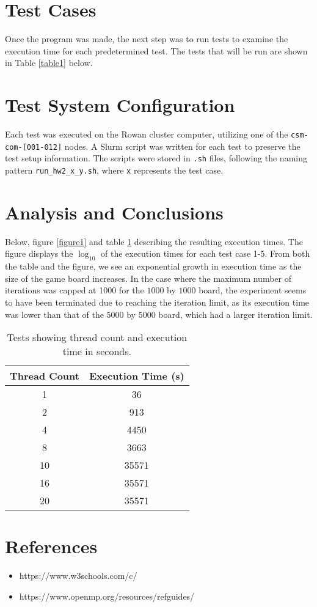 \documentclass{article}
\begin{document}
	\section{Test Cases}
	Once the program was made, the next step was to run tests to examine the execution time for each predetermined test. The tests that will be run are shown in Table \ref{table1} below.

	\section{Test System Configuration}
	Each test was executed on the Rowan cluster computer, utilizing one of the \texttt{csm-com-[001-012]} nodes. A Slurm script was written for each test to preserve the test setup information. The scripts were stored in \texttt{.sh} files, following the naming pattern \texttt{run\_hw2\_x\_y.sh}, where \texttt{x} represents the test case.

	\section{Analysis and Conclusions}
	Below, figure \ref{figure1} and table \ref{table2} describing the resulting execution times. The figure displays the \(\log_{10}\) of the execution times for each test case 1-5. From both the table and the figure, we see an exponential growth in execution time as the size of the game board increases. In the case where the maximum number of iterations was capped at 1000 for the \(1000\) by \(1000\) board, the experiment seems to have been terminated due to reaching the iteration limit, as its execution time was lower than that of the \(5000\) by \(5000\) board, which had a larger iteration limit.
	
	
	\begin{table}[t]
		\centering
		\begin{tabular}{|c|c|}
			\hline
			\textbf{Thread Count} & \textbf{Execution Time (s)} \\
			\hline
			1 & 36 \\
			2 & 913 \\
			4 & 4450 \\
			8 & 3663 \\
			10 & 35571 \\
			16 & 35571 \\
			20 & 35571 \\
			\hline
		\end{tabular}
		\caption{Tests showing thread count and execution time in seconds.}
		\label{table2}
	\end{table}
	
	\section{References}
	\begin{itemize}
		\item https://www.w3schools.com/c/
		\item https://www.openmp.org/resources/refguides/
	\end{itemize}
	
\end{document}
